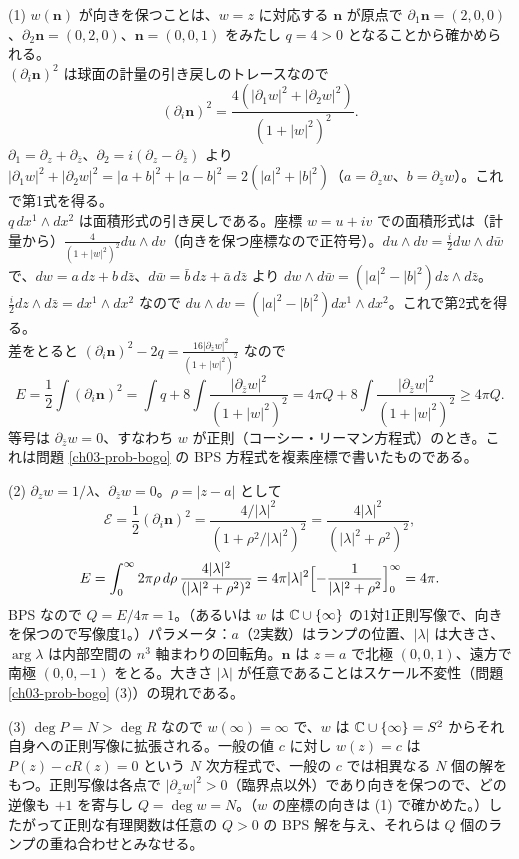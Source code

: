 \begin{solution}
(1) $w(\bm n)$ が向きを保つことは、$w=z$ に対応する $\bm n$ が原点で $\partial_1\bm n=(2,0,0)$、$\partial_2\bm n=(0,2,0)$、$\bm n=(0,0,1)$ をみたし $q=4>0$ となることから確かめられる。\\
$(\partial_i\bm n)^2$ は球面の計量の引き戻しのトレースなので
\[
(\partial_i\bm n)^2=\frac{4(\lvert\partial_1w\rvert^2+\lvert\partial_2w\rvert^2)}{(1+\lvert w\rvert^2)^2}.
\]
$\partial_1=\partial_z+\partial_{\bar z}$、$\partial_2=i(\partial_z-\partial_{\bar z})$ より $\lvert\partial_1w\rvert^2+\lvert\partial_2w\rvert^2=\lvert a+b\rvert^2+\lvert a-b\rvert^2=2(\lvert a\rvert^2+\lvert b\rvert^2)$（$a=\partial_zw$、$b=\partial_{\bar z}w$）。これで第1式を得る。\\
$q\,dx^1\wedge dx^2$ は面積形式の引き戻しである。座標 $w=u+iv$ での面積形式は（計量から）$\frac{4}{(1+\lvert w\rvert^2)^2}du\wedge dv$（向きを保つ座標なので正符号）。$du\wedge dv=\frac{i}{2}dw\wedge d\bar w$ で、$dw=a\,dz+b\,d\bar z$、$d\bar w=\bar b\,dz+\bar a\,d\bar z$ より $dw\wedge d\bar w=(\lvert a\rvert^2-\lvert b\rvert^2)dz\wedge d\bar z$。$\frac i2dz\wedge d\bar z=dx^1\wedge dx^2$ なので $du\wedge dv=(\lvert a\rvert^2-\lvert b\rvert^2)dx^1\wedge dx^2$。これで第2式を得る。\\
差をとると $(\partial_i\bm n)^2-2q=\frac{16\lvert\partial_{\bar z}w\rvert^2}{(1+\lvert w\rvert^2)^2}$ なので
\[
E=\frac12\int(\partial_i\bm n)^2=\int q+8\int\frac{\lvert\partial_{\bar z}w\rvert^2}{(1+\lvert w\rvert^2)^2}=4\pi Q+8\int\frac{\lvert\partial_{\bar z}w\rvert^2}{(1+\lvert w\rvert^2)^2}\ge4\pi Q .
\]
等号は $\partial_{\bar z}w=0$、すなわち $w$ が正則（コーシー・リーマン方程式）のとき。これは問題 \ref{ch03-prob-bogo} の BPS 方程式を複素座標で書いたものである。

(2) $\partial_zw=1/\lambda$、$\partial_{\bar z}w=0$。$\rho=\lvert z-a\rvert$ として
\[
\mathcal E=\frac12(\partial_i\bm n)^2=\frac{4/\lvert\lambda\rvert^2}{(1+\rho^2/\lvert\lambda\rvert^2)^2}=\frac{4\lvert\lambda\rvert^2}{(\lvert\lambda\rvert^2+\rho^2)^2},
\]
\[
E=\int_0^\infty2\pi\rho\,d\rho\,\frac{4\lvert\lambda\rvert^2}{(\lvert\lambda\rvert^2+\rho^2)^2}=4\pi\lvert\lambda\rvert^2\Bigl[-\frac{1}{\lvert\lambda\rvert^2+\rho^2}\Bigr]_0^\infty=4\pi .
\]
BPS なので $Q=E/4\pi=1$。（あるいは $w$ は $\mathbb{C}\cup\{\infty\}$ の1対1正則写像で、向きを保つので写像度1。）パラメータ：$a$（2実数）はランプの位置、$\lvert\lambda\rvert$ は大きさ、$\arg\lambda$ は内部空間の $n^3$ 軸まわりの回転角。$\bm n$ は $z=a$ で北極 $(0,0,1)$、遠方で南極 $(0,0,-1)$ をとる。大きさ $\lvert\lambda\rvert$ が任意であることはスケール不変性（問題 \ref{ch03-prob-bogo} (3)）の現れである。

(3) $\deg P=N>\deg R$ なので $w(\infty)=\infty$ で、$w$ は $\mathbb{C}\cup\{\infty\}=S^2$ からそれ自身への正則写像に拡張される。一般の値 $c$ に対し $w(z)=c$ は $P(z)-cR(z)=0$ という $N$ 次方程式で、一般の $c$ では相異なる $N$ 個の解をもつ。正則写像は各点で $\lvert\partial_zw\rvert^2>0$（臨界点以外）であり向きを保つので、どの逆像も $+1$ を寄与し $Q=\deg w=N$。（$w$ の座標の向きは (1) で確かめた。）したがって正則な有理関数は任意の $Q>0$ の BPS 解を与え、それらは $Q$ 個のランプの重ね合わせとみなせる。
\end{solution}

